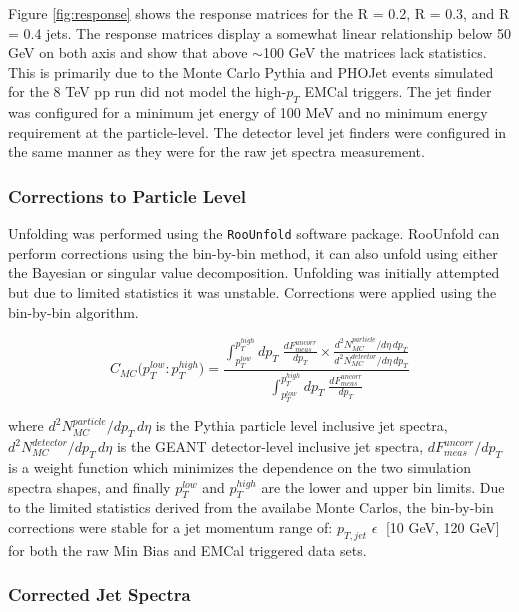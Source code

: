 Figure \ref{fig:response} shows the response matrices for the R = 0.2, R = 0.3, and R = 0.4 jets.  The response matrices display a somewhat linear relationship below 50 GeV on both axis and show that above $\sim$100 GeV the matrices lack statistics.  This is primarily due to the Monte Carlo Pythia and PHOJet events simulated for the 8 TeV pp run did not model the high-$p_{T}$ EMCal triggers.  The jet finder was configured for a minimum jet energy of 100 MeV and no minimum energy requirement at the particle-level.  The detector level jet finders were configured in the same manner as they were for the raw jet spectra measurement.  

\subsubsection{Corrections to Particle Level}

Unfolding was performed using the \verb+RooUnfold+\cite{Adye:2011gm} software package.  RooUnfold can perform corrections using the bin-by-bin method, it can also unfold using either the Bayesian or singular value decomposition.  Unfolding was initially attempted but due to limited statistics it was unstable. Corrections were applied using the bin-by-bin\cite{Cowan:2002in} algorithm. 

\begin{equation}
C_{MC} \big( p_{T}^{low} : p_{T}^{high} \big) =  \frac{  \int^{p_{T}^{high}}_{p_{T}^{low}} dp_{T} \; \frac{dF^{uncorr}_{meas}}{dp_{T}} \times \frac{d^{2}N^{particle}_{MC}/d\eta \, dp_{T}}{d^{2}N^{detector}_{MC}/d\eta \, dp_{T}}  } { \int^{p_{T}^{high}}_{p_{T}^{low}} dp_{T} \; \frac{dF^{uncorr}_{meas}}{dp_{T}} }
\label{eq:binbybin}
\end{equation}

\noindent
where $d^{2}N^{particle}_{MC}/dp_{T} \, d\eta$ is the Pythia particle level inclusive jet spectra, $d^{2}N^{detector}_{MC}/dp_{T} \, d\eta$ is the GEANT detector-level inclusive jet spectra, $dF^{uncorr}_{meas} / dp_{T}$ is a weight function which minimizes the dependence on the two simulation spectra shapes, and finally $p_{T}^{low}$ and $p_{T}^{high}$ are the lower and upper bin limits.  Due to the limited statistics derived from the availabe Monte Carlos, the bin-by-bin corrections were stable for a jet momentum range of: $p_{T,jet} \, \, \epsilon \;$ [10 GeV, 120 GeV] for both the raw Min Bias and EMCal triggered data sets.  

\subsubsection{Corrected Jet Spectra}


